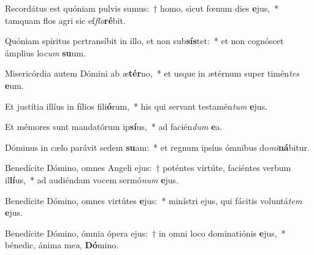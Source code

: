 \item Recordátus est quóniam pulvis sumus:~† homo, sicut fœnum dies \textbf{e}jus,~* tamquam flos agri sic ef\textit{flo}\textbf{ré}bit.
\item Quóniam spíritus pertransíbit in illo, et non sub\textbf{sís}tet:~* et non cognóscet ámplius lo\textit{cum} \textbf{su}um.
\item Misericórdia autem Dómini ab æ\textbf{tér}no,~* et usque in ætérnum super timén\textit{tes} \textbf{e}um.
\item Et justítia illíus in fílios fili\textbf{ó}rum,~* his qui servant testamén\textit{tum} \textbf{e}jus.
\item Et mémores sunt mandatórum ip\textbf{sí}us,~* ad facién\textit{dum} \textbf{e}a.
\item Dóminus in cælo parávit sedem \textbf{su}am:~* et regnum ipsíus ómnibus do\textit{mi}\textbf{ná}bitur.
\item Benedícite Dómino, omnes Angeli ejus:~† poténtes virtúte, faciéntes verbum il\textbf{lí}us,~* ad audiéndam vocem sermó\textit{num} \textbf{e}jus.
\item Benedícite Dómino, omnes virtútes \textbf{e}jus:~* minístri ejus, qui fácitis voluntá\textit{tem} \textbf{e}jus.
\item Benedícite Dómino, ómnia ópera ejus:~† in omni loco dominatiónis \textbf{e}jus,~* bénedic, ánima me\textit{a}, \textbf{Dó}mino.

